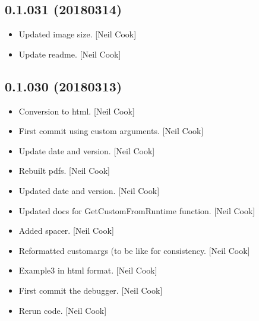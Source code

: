 \documentclass[a4paper,10pt,english]{report}
\begin{document}
\subsection{0.1.031 (2018\sphinxhyphen{}03\sphinxhyphen{}14)}
\label{\detokenize{misc/changelog:id492}}\begin{itemize}
\item {} 
Updated image size. {[}Neil Cook{]}

\item {} 
Update readme. {[}Neil Cook{]}

\end{itemize}


\subsection{0.1.030 (2018\sphinxhyphen{}03\sphinxhyphen{}13)}
\label{\detokenize{misc/changelog:id493}}\begin{itemize}
\item {} 
Conversion to html. {[}Neil Cook{]}

\item {} 
First commit \sphinxhyphen{} using custom arguments. {[}Neil Cook{]}

\item {} 
Update date and version. {[}Neil Cook{]}

\item {} 
Rebuilt pdfs. {[}Neil Cook{]}

\item {} 
Updated date and version. {[}Neil Cook{]}

\item {} 
Updated docs for GetCustomFromRuntime function. {[}Neil Cook{]}

\item {} 
Added spacer. {[}Neil Cook{]}

\item {} 
Reformatted customargs (to be like  for consistency. {[}Neil
Cook{]}

\item {} 
Example3 in html format. {[}Neil Cook{]}

\item {} 
First commit \sphinxhyphen{} the debugger. {[}Neil Cook{]}

\item {} 
Rerun code. {[}Neil Cook{]}

\end{itemize}
\end{document}
